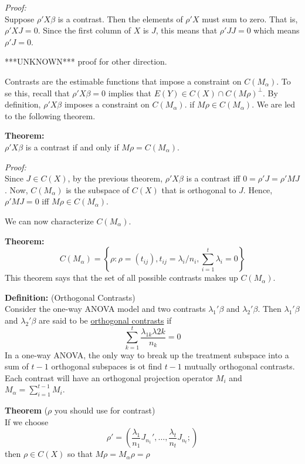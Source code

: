 \documentclass[12pt]{article}
\numberwithin{equation}{section}
\begin{document}
\textit{Proof:}\\
Suppose $\rho' X \beta$ is a contrast. Then the elements of $\rho'X$ must sum to zero. That is, $\rho' X J = 0$. Since the first column of $X$ is $J$, this means that $\rho' J J = 0$ which means $\rho'J = 0$. 

***UNKNOWN*** proof for other direction.

Contrasts are the estimable functions that impose a constraint on $C(M_\alpha)$. To se this, recall that $\rho'X\beta = 0$ implies that $E(Y) \in C(X) \cap C(M\rho)^{\perp}$. By definition, $\rho'X\beta$ imposes a constraint on $C(M_\alpha)$. if $M \rho \in C(M_\alpha)$. We are led to the following theorem.

\textbf{Theorem:} \\
$\rho'X\beta$ is a contrast if and only if $M\rho = C(M_\alpha)$.

\textit{Proof:} \\
Since $J \in C(X)$, by the previous theorem, $\rho'X\beta$ is a contrast iff $0 = \rho' J = \rho' M J$. Now, $C(M_\alpha)$ is the subspace of $C(X)$ that is orthogonal to $J$. Hence, $\rho'MJ = 0$ iff $M\rho \in C(M_\alpha)$.

We can now characterize $C(M_\alpha)$.

\textbf{Theorem:}\\
\begin{equation*}
   C(M_\alpha) = \left\{
   \rho: \rho = (t_{ij}), t_{ij} = \lambda_i / n_i, \sum_{i=1}^t \lambda_i = 0
   \right\}
\end{equation*}
This theorem says that the set of all possible contrasts makes up $C(M_\alpha)$. 

\textbf{Definition:} (Orthogonal Contrasts) \\
Consider the one-way ANOVA model and two contrasts $\lambda_1 ' \beta$ and $\lambda_2' \beta$. Then $\lambda_1' \beta$ and $\lambda_2' \beta$ are said to be \underline{orthogonal contrasts} if 
%
\begin{equation*}
  \sum_{k = 1}^t \frac{\lambda_{1k} \lambda{2k}}{n_k} = 0
\end{equation*}
%
In  a one-way ANOVA, the only way to break up the treatment subspace into a sum of $t - 1$ orthogonal subspaces is ot find $t - 1$ mutually orthogonal contrasts. Each contrast will have an orthogonal projection operator $M_i$ and $M_\alpha = \sum_{i = 1}^{t-1} M_i$.

\textbf{Theorem} ($\rho$ you should use for contrast) \\
If we choose
\begin{equation*}
  \rho' = (\frac{\lambda_1}{n_1} J_{n_1}', \ldots, \frac{\lambda_t}{n_t} J_{n_t};)
\end{equation*}
%
then $\rho \in C(X)$ so that $M\rho = M_{\alpha} \rho = \rho$
\end{document}
